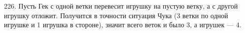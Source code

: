 226. Пусть Гек с одной ветки перевесит игрушку на пустую ветку, а с другой игрушку отложит. Получится в точности ситуация Чука (3 ветки по одной игрушке и 1 игрушка в стороне), значит всего веток и было 3, а игрушек --- 4.\\
